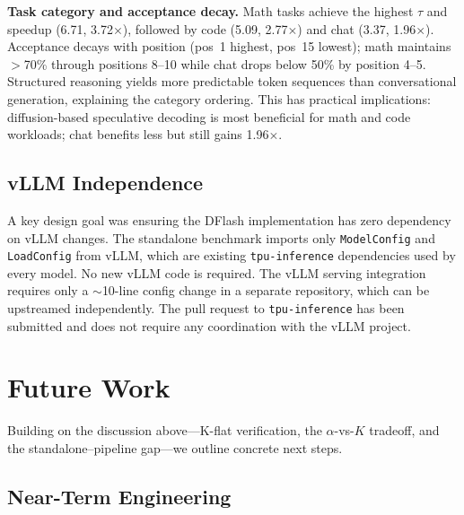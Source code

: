 \documentclass[12pt,letterpaper]{article}
\begin{document}
\textbf{Task category and acceptance decay.} Math tasks achieve the highest $\tau$ and speedup (6.71, 3.72$\times$), followed by code (5.09, 2.77$\times$) and chat (3.37, 1.96$\times$). Acceptance decays with position (pos~1 highest, pos~15 lowest); math maintains $>$70\% through positions 8--10 while chat drops below 50\% by position 4--5. Structured reasoning yields more predictable token sequences than conversational generation, explaining the category ordering. This has practical implications: diffusion-based speculative decoding is most beneficial for math and code workloads; chat benefits less but still gains 1.96$\times$.

\subsection{vLLM Independence}

A key design goal was ensuring the DFlash implementation has zero dependency on vLLM changes. The standalone benchmark imports only \texttt{ModelConfig} and \texttt{LoadConfig} from vLLM, which are existing \texttt{tpu-inference} dependencies used by every model. No new vLLM code is required. The vLLM serving integration requires only a $\sim$10-line config change in a separate repository, which can be upstreamed independently. The pull request to \texttt{tpu-inference} has been submitted and does not require any coordination with the vLLM project.


\section{Future Work}

Building on the discussion above---K-flat verification, the $\alpha$-vs-$K$ tradeoff, and the standalone--pipeline gap---we outline concrete next steps.

\subsection{Near-Term Engineering}
\end{document}
